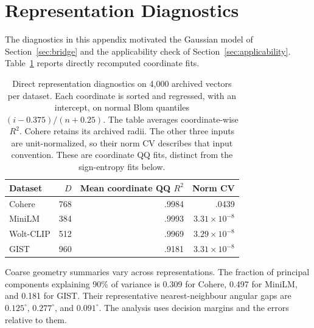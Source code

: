 \section{Representation Diagnostics}
\label{app:foundational}

The diagnostics in this appendix motivated the Gaussian model of Section~\ref{sec:bridge} and the applicability check of Section~\ref{sec:applicability}. Table~\ref{tab:app-coordinate-qq} reports directly recomputed coordinate fits.

\begin{table}[!htbp]
\centering
\small
\begin{tabular}{lrrr}
\toprule
Dataset & $D$ & Mean coordinate QQ $R^2$ & Norm CV \\
\midrule
Cohere & 768 & .9984 & .0439 \\
MiniLM & 384 & .9993 & $3.31\times10^{-8}$ \\
Wolt-CLIP & 512 & .9969 & $3.29\times10^{-8}$ \\
GIST & 960 & .9181 & $3.31\times10^{-8}$ \\
\bottomrule
\end{tabular}
\caption{Direct representation diagnostics on 4{,}000 archived vectors per dataset. Each coordinate is sorted and regressed, with an intercept, on normal Blom quantiles $(i-0.375)/(n+0.25)$. The table averages coordinate-wise $R^2$. Cohere retains its archived radii. The other three inputs are unit-normalized, so their norm CV describes that input convention. These are coordinate QQ fits, distinct from the sign-entropy fits below.}
\label{tab:app-coordinate-qq}
\end{table}



Coarse geometry summaries vary across representations. The fraction of principal components explaining 90\% of variance is 0.309 for Cohere, 0.497 for MiniLM, and 0.181 for GIST. Their representative nearest-neighbour angular gaps are $0.125^\circ$, $0.277^\circ$, and $0.091^\circ$. The analysis uses decision margins and the errors relative to them.

